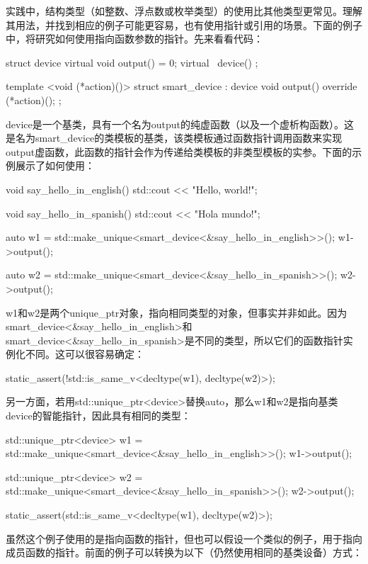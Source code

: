 实践中，结构类型（如整数、浮点数或枚举类型）的使用比其他类型更常见。理解其用法，并找到相应的例子可能更容易，也有使用指针或引用的场景。下面的例子中，将研究如何使用指向函数参数的指针。先来看看代码：

\begin{cppcode}
struct device
{
	virtual void output() = 0;
	virtual ~device() {}
};

template <void (*action)()>
struct smart_device : device
{
	void output() override
	{
		(*action)();
	}
};
\end{cppcode}

device是一个基类，具有一个名为output的纯虚函数（以及一个虚析构函数）。这是名为smart_device的类模板的基类，该类模板通过函数指针调用函数来实现output虚函数，此函数的指针会作为传递给类模板的非类型模板的实参。下面的示例展示了如何使用：

\begin{cppcode}
void say_hello_in_english()
{
	std::cout << "Hello, world!\n";
}

void say_hello_in_spanish()
{
	std::cout << "Hola mundo!\n";
}

auto w1 =
	std::make_unique<smart_device<&say_hello_in_english>>();
w1->output();

auto w2 =
	std::make_unique<smart_device<&say_hello_in_spanish>>();
w2->output();
\end{cppcode}

w1和w2是两个unique_ptr对象，指向相同类型的对象，但事实并非如此。因为smart_device<\&say_hello_in_english>和smart_device<\&say_hello_in_spanish>是不同的类型，所以它们的函数指针实例化不同。这可以很容易确定：

\begin{cppcode}
static_assert(!std::is_same_v<decltype(w1), decltype(w2)>);
\end{cppcode}

另一方面，若用std::unique_ptr<device>替换auto，那么w1和w2是指向基类device的智能指针，因此具有相同的类型：

\begin{cppcode}
std::unique_ptr<device> w1 =
	std::make_unique<smart_device<&say_hello_in_english>>();
w1->output();

std::unique_ptr<device> w2 =
	std::make_unique<smart_device<&say_hello_in_spanish>>();
w2->output();

static_assert(std::is_same_v<decltype(w1), decltype(w2)>);
\end{cppcode}

虽然这个例子使用的是指向函数的指针，但也可以假设一个类似的例子，用于指向成员函数的指针。前面的例子可以转换为以下（仍然使用相同的基类设备）方式：

